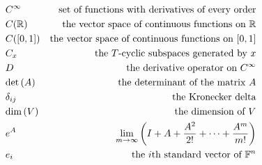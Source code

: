 \begin{align*}
	 & C^\infty                          & \text{set of functions with derivatives of every order}                          \\
	 & C(\mathbb{R})                             & \text{the vector space of continuous functions on $\mathbb{R}$}                          \\
	 & C([0,1])                          & \text{the vector space of continuous functions on $[0,1]$}                       \\
	 & C_x                               & \text{the $T$-cyclic subspaces generated by $x$}                                 \\
	 & D                                 & \text{the derivative operator on $C^\infty$}                                     \\
	 & \text{det}\left(A\right)                          & \text{the determinant of the matrix $A$}                                         \\
	 & \delta_{ij}                       & \text{the Kronecker delta}                                                       \\
	 & \text{dim}\left(V\right)                          & \text{the dimension of $V$}                                                      \\
	 & e^A                               & \lim_{m \to \infty} \left(I + A + \frac{A^2}{2!} + \dots + \frac{A^m}{m!}\right) \\
	 & e_i                               & \text{the $i$th standard vector of $\mathbb{F}^n$}                                       \\
\end{align*}

